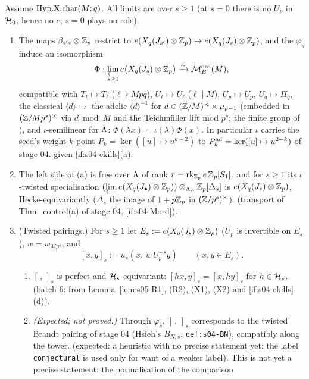 \begin{proposition}\label{prop:s05-Xlambda}
Assume $\mathrm{Hyp.X.char}(M;q)$. All limits are over $s\ge1$ (at $s=0$ there is no $U_p$ in $\mathcal{H}_0$, hence no $e$; $s=0$ plays no role).
\begin{enumerate}[label=(\alph*)]
\item The maps $\beta_{s's}\otimes\mathbb{Z}_p$ restrict to $e(X_q(J_{s'})\otimes\mathbb{Z}_p)\to e(X_q(J_s)\otimes\mathbb{Z}_p)$, and the $\varphi_s$ induce an isomorphism
  \[\Phi:\varprojlim_{s\ge1}e\big(X_q(J_s)\otimes\mathbb{Z}_p\big)\xrightarrow{\sim}\mathcal{M}^{\mathrm{ord}}_B(M),\]
  compatible with $T_\ell\mapsto T_\ell$ ($\ell\nmid Mpq$), $U_\ell\mapsto U_\ell$ ($\ell\mid M$), $U_p\mapsto U_p$, $U_q\mapsto\Pi_q$, the classical
  $\langle d\rangle\mapsto$ the adelic $\langle d\rangle^{-1}$ for $d\in(\mathbb{Z}/M)^\times\times\mu_{p-1}$ (embedded in $(\mathbb{Z}/Mp^s)^\times$ via $d\bmod M$ and the
  Teichmüller lift mod $p^s$; the finite group of ), and $\iota$-semilinear for $\Lambda$: $\Phi(\lambda x)=\iota(\lambda)\Phi(x)$.
  In particular $\iota$ carries the seed's weight-$k$ point $P_k=\ker([u]\mapsto u^{k-2})$ to $P^{\rm ad}_k=\ker([u]\mapsto u^{2-k})$ of stage 04.
  \stproved{} given \ref{if:s04-ekills}(a).
\item The left side of (a) is free over $\Lambda$ of rank $r=\operatorname{rk}_{\mathbb{Z}_p}e\,\mathbb{Z}_p[S_1]$, and for $s\ge1$ its $\iota$-twisted specialisation
  $(\varprojlim e(X_q(J_\bullet)\otimes\mathbb{Z}_p))\otimes_{\Lambda,\iota}\mathbb{Z}_p[\Delta_s]$ is $e(X_q(J_s)\otimes\mathbb{Z}_p)$, Hecke-equivariantly
  ($\Delta_s$ the image of $1+p\mathbb{Z}_p$ in $(\mathbb{Z}/p^s)^\times$). \stpmc{} (transport of Thm.~control(a) of stage 04, \ref{if:s04-Mord}).
\item (Twisted pairings.) For $s\ge1$ let $E_s:=e(X_q(J_s)\otimes\mathbb{Z}_p)$ ($U_p$ is invertible on $E_s$), $w=w_{Mp^s}$, and
  \[[x,y]_s:=u_s(x,\,w\,U_p^{-s}y)\qquad(x,y\in E_s).\]
  \begin{enumerate}[label=(c\arabic*)]
  \item $[\,,\,]_s$ is perfect and $\mathcal{H}_s$-equivariant: $[hx,y]_s=[x,hy]_s$ for $h\in\mathcal{H}_s$. \stpmc{} (batch 6: from Lemma~\ref{lem:s05-R1}, (R2), (X1), (X2) and
    \ref{if:s04-ekills}(d)).
  \item \emph{(Expected; not proved.)} Through $\varphi_s$, $[\,,\,]_s$ corresponds to the twisted Brandt pairing of stage 04 (Hsieh's $B_{N,s}$,
    \texttt{def:s04-BN}), compatibly along the tower. \stopen{} (expected: a heuristic with no precise statement yet; the label \texttt{conjectural} is used only for want of a weaker label). This is not yet a precise statement: the normalisation of the comparison

\end{enumerate}
\end{enumerate}
\end{proposition}
